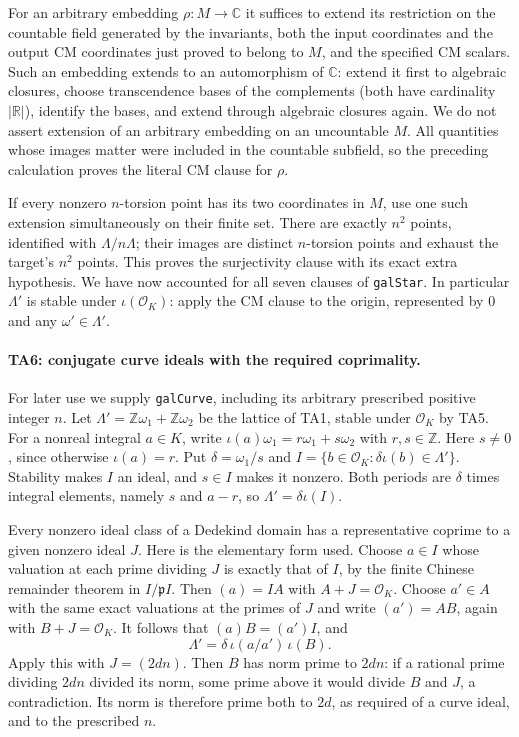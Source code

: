 For an arbitrary embedding $\rho:M\to\mathbb C$ it suffices
to extend its restriction on the countable field generated by
the invariants, both the input coordinates and the output
CM coordinates just proved to belong to $M$, and the
specified CM scalars. Such an embedding extends to an
automorphism of $\mathbb C$: extend it first to algebraic
closures, choose transcendence bases of the complements
(both have cardinality $|\mathbb R|$), identify the bases,
and extend through algebraic closures again. We do not assert
extension of an arbitrary embedding on an uncountable $M$.
All quantities whose images matter were included in the
countable subfield, so the preceding calculation proves the
literal CM clause for $\rho$.

If every nonzero $n$-torsion point has its two coordinates in
$M$, use one such extension simultaneously on their finite
set. There are exactly $n^2$ points, identified with
$\Lambda/n\Lambda$; their images are distinct $n$-torsion
points and exhaust the target's $n^2$ points. This proves the
surjectivity clause with its exact extra hypothesis. We have
now accounted for all seven clauses of \texttt{galStar}.
In particular $\Lambda'$ is stable under $\iota(\mathcal O_K)$:
apply the CM clause to the origin, represented by $0$ and any
$\omega'\in\Lambda'$.

\paragraph{TA6: conjugate curve ideals with the required coprimality.}
For later use we supply \texttt{galCurve}, including its
arbitrary prescribed positive integer $n$. Let
$\Lambda'=\mathbb Z\omega_1+\mathbb Z\omega_2$ be the lattice
of TA1, stable under $\mathcal O_K$ by TA5. For a nonreal
integral $a\in K$, write
$\iota(a)\omega_1=r\omega_1+s\omega_2$ with $r,s\in\mathbb Z$.
Here $s\ne0$, since otherwise $\iota(a)=r$. Put
$\delta=\omega_1/s$ and
$I=\{b\in\mathcal O_K:\delta\iota(b)\in\Lambda'\}$.
Stability makes $I$ an ideal, and $s\in I$ makes it nonzero.
Both periods are $\delta$ times integral elements, namely
$s$ and $a-r$, so $\Lambda'=\delta\iota(I)$.

Every nonzero ideal class of a Dedekind domain has a
representative coprime to a given nonzero ideal $J$.
Here is the elementary form used. Choose $a\in I$ whose
valuation at each prime dividing $J$ is exactly that of $I$,
by the finite Chinese remainder theorem in $I/\mathfrak p I$.
Then $(a)=I A$ with $A+J=\mathcal O_K$. Choose $a'\in A$
with the same exact valuations at the primes of $J$ and write
$(a')=A B$, again with $B+J=\mathcal O_K$.
It follows that $(a)B=(a')I$, and
\[
 \Lambda'=\delta\,\iota(a/a')\,\iota(B).                     \tag{TA.11}
\]
Apply this with $J=(2dn)$. Then $B$ has norm prime to $2dn$:
if a rational prime dividing $2dn$ divided its norm, some
prime above it would divide $B$ and $J$, a contradiction.
Its norm is therefore prime both to $2d$, as required of a
curve ideal, and to the prescribed $n$.

